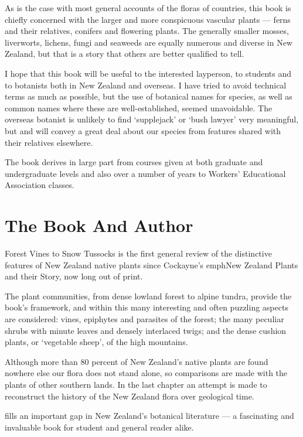 As is the case with most general accounts of the floras of countries, this book is chiefly concerned with the larger and more conspicuous vascular plants --- ferns and their relatives, conifers and flowering plants.
The generally smaller mosses, liverworts, lichens, fungi and seaweeds are equally numerous and diverse in New Zealand, but that is a story that others are better qualified to tell.

I hope that this book will be useful to the interested layperson, to students and to botanists both in New Zealand and overseas.
I have tried to avoid technical terms as much as possible, but the use of botanical names for species, as well as common names where these are well-established, seemed unavoidable.
The overseas botanist is unlikely to find `supplejack' or `bush lawyer' very meaningful, but  and  will convey a great deal about our species from features shared with their relatives elsewhere.

The book derives in large part from courses given at both graduate and undergraduate levels and also over a number of years to Workers' Educational Association classes.

\section*{The Book And Author}

Forest Vines to Snow Tussocks is the first general review of the distinctive features of New Zealand native plants since Cockayne's emph{New Zealand Plants and their Story}, now long out of print.

The plant communities, from dense lowland forest to alpine tundra, provide the book's framework, and within this many interesting and often puzzling aspects are considered: vines, epiphytes and parasites of the forest; the many peculiar shrubs with minute leaves and densely interlaced twigs; and the dense cushion plants, or `vegetable sheep', of the high mountains.

Although more than 80 percent of New Zealand's native plants are found nowhere else our flora does not stand alone, so comparisons are made with the plants of other southern lands.
In the last chapter an attempt is made to reconstruct the history of the New Zealand flora over geological time.

 fills an important gap in New Zealand's botanical literature — a fascinating and invaluable book for student and general reader alike.

